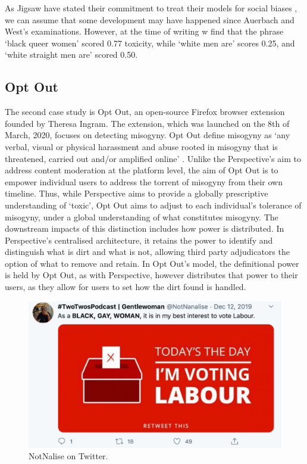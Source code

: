 As Jigsaw have stated their commitment to treat their models for social biases \cite{Marvin:2019}, we can assume that some development may have happened since Auerbach and West's examinations. 
However, at the time of writing w find that the phrase ‘black queer women’ scored 0.77 toxicity, while ‘white men are’ scores 0.25, and ‘white straight men are’ scored 0.50.

\subsection{Opt Out}\label{sub:optout}
The second case study is Opt Out, an open-source Firefox browser extension founded by Theresa Ingram.
The extension, which was launched on the 8th of March, 2020, focuses on detecting misogyny. 
Opt Out define misogyny as `any verbal, visual or physical harassment and abuse rooted in misogyny that is threatened, carried out and/or amplified online' \cite{Ingram:2020}. 
Unlike the Perspective's aim to address content moderation at the platform level, the aim of Opt Out is to empower individual users to address the torrent of misogyny from their own timeline. 
Thus, while Perspective aims to provide a globally prescriptive understanding of `toxic', Opt Out aims to adjust to each individual's tolerance of misogyny, under a global understanding of what constitutes misogyny. 
The downstream impacts of this distinction includes how power is distributed. 
In Perspective's centralised architecture, it retains the power to identify and distinguish what is dirt and what is not, allowing third party adjudicators the option of what to remove and retain. 
In Opt Out's model, the definitional power is held by Opt Out, as with Perspective, however distributes that power to their users, as they allow for users to set how the dirt found is handled.

\begin{figure}[!ht]
  \centering
  \includegraphics[scale=0.5]{Notnalise.png}
  \caption{NotNalise on Twitter.}
  \label{fig:notnalise}
\end{figure}

